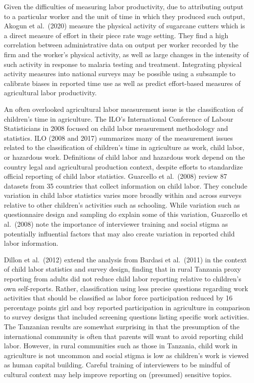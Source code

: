 \documentclass[
]{book}
\begin{document}
Given the difficulties of measuring labor productivity, due to attributing output to a particular worker and the unit of time in which they produced such output, Akogun et al.~(2020) measure the physical activity of sugarcane cutters which is a direct measure of effort in their piece rate wage setting. They find a high correlation between administrative data on output per worker recorded by the firm and the worker's physical activity, as well as large changes in the intensity of such activity in response to malaria testing and treatment. Integrating physical activity measures into national surveys may be possible using a subsample to calibrate biases in reported time use as well as predict effort-based measures of agricultural labor productivity.

An often overlooked agricultural labor measurement issue is the classification of children's time in agriculture. The ILO's International Conference of Labour Statisticians in 2008 focused on child labor measurement methodology and statistics. ILO (2008 and 2017) summarizes many of the measurement issues related to the classification of children's time in agriculture as work, child labor, or hazardous work. Definitions of child labor and hazardous work depend on the country legal and agricultural production context, despite efforts to standardize official reporting of child labor statistics. Guarcello et al.~(2008) review 87 datasets from 35 countries that collect information on child labor. They conclude variation in child labor statistics varies more broadly within and across surveys relative to other children's activities such as schooling. While variation such as questionnaire design and sampling do explain some of this variation, Guarcello et al.~(2008) note the importance of interviewer training and social stigma as potentially influential factors that may also create variation in reported child labor information.

Dillon et al.~(2012) extend the analysis from Bardasi et al.~(2011) in the context of child labor statistics and survey design, finding that in rural Tanzania proxy reporting from adults did not reduce child labor reporting relative to children's own self-reports. Rather, classification using less precise questions regarding work activities that should be classified as labor force participation reduced by 16 percentage points girl and boy reported participation in agriculture in comparison to survey designs that included screening questions listing specific work activities. The Tanzanian results are somewhat surprising in that the presumption of the international community is often that parents will want to avoid reporting child labor. However, in rural communities such as those in Tanzania, child work in agriculture is not uncommon and social stigma is low as children's work is viewed as human capital building. Careful training of interviewers to be mindful of cultural context may help improve reporting on (presumed) sensitive topics.
\end{document}
